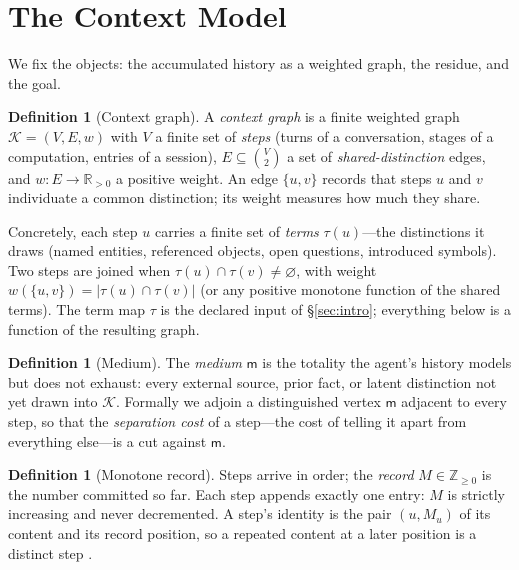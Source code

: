 \documentclass[11pt,a4paper]{article}
\theoremstyle{thmstyle}
\theoremstyle{definition}
\newtheorem{definition}[theorem]{Definition}
\theoremstyle{remark}
\newcommand{\R}{\mathbb{R}}
\newcommand{\Zp}{\mathbb{Z}_{\ge 0}}
\newcommand{\Ctx}{\mathcal{K}}          %
\newcommand{\Vrt}{V}
\newcommand{\Edg}{E}
\newcommand{\wt}{w}
\newcommand{\med}{\mathsf{m}}           %
\newcommand{\abs}[1]{\lvert#1\rvert}
\newcommand{\set}[1]{\{#1\}}
\begin{document}
\section{The Context Model}
\label{sec:model}

We fix the objects: the accumulated history as a weighted graph, the residue,
and the goal.

\begin{definition}[Context graph]
\label{def:ctx}
A \emph{context graph} is a finite weighted graph $\Ctx=(\Vrt,\Edg,\wt)$ with
$\Vrt$ a finite set of \emph{steps} (turns of a conversation, stages of a
computation, entries of a session), $\Edg\subseteq\binom{\Vrt}{2}$ a set of
\emph{shared-distinction} edges, and $\wt\colon\Edg\to\R_{>0}$ a positive weight.
An edge $\set{u,v}$ records that steps $u$ and $v$ individuate a common
distinction; its weight measures how much they share.
\end{definition}

Concretely, each step $u$ carries a finite set of \emph{terms} $\tau(u)$---the
distinctions it draws (named entities, referenced objects, open questions,
introduced symbols). Two steps are joined when $\tau(u)\cap\tau(v)\neq\varnothing$,
with weight $\wt(\set{u,v})=\abs{\tau(u)\cap\tau(v)}$ (or any positive monotone
function of the shared terms). The term map $\tau$ is the declared input of
\S\ref{sec:intro}; everything below is a function of the resulting graph.

\begin{definition}[Medium]
\label{def:medium}
The \emph{medium} $\med$ is the totality the agent's history models but does not
exhaust: every external source, prior fact, or latent distinction not yet drawn
into $\Ctx$. Formally we adjoin a distinguished vertex $\med$ adjacent to every
step, so that the \emph{separation cost} of a step---the cost of telling it apart
from everything else---is a cut against $\med$.
\end{definition}

\begin{definition}[Monotone record]
\label{def:record}
Steps arrive in order; the \emph{record} $M\in\Zp$ is the number committed so
far. Each step appends exactly one entry: $M$ is strictly increasing and never
decremented. A step's identity is the pair $(u,M_u)$ of its content and its
record position, so a repeated content at a later position is a distinct step
\citep{lamport1978}.
\end{definition}
\end{document}
